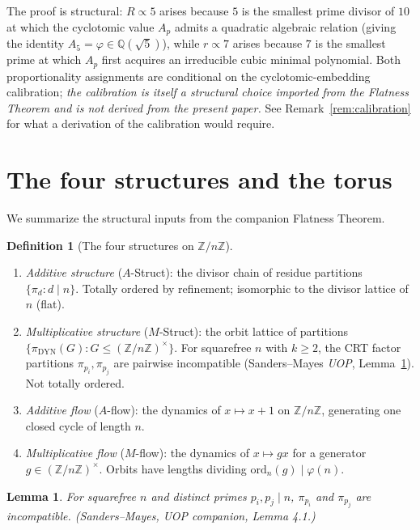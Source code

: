 \documentclass[11pt,reqno]{amsart}
\theoremstyle{plain}
\newtheorem{lemma}[theorem]{Lemma}
\theoremstyle{definition}
\newtheorem{definition}[theorem]{Definition}
\newcommand{\Z}{\mathbb{Z}}
\newcommand{\Q}{\mathbb{Q}}
\newcommand{\Zn}{\Z/n\Z}
\newcommand{\Zns}{(\Z/n\Z)^{\times}}
\newcommand{\DYN}{\mathrm{DYN}}
\newcommand{\ord}{\mathrm{ord}}
\begin{document}
The proof is structural: $R \propto 5$ arises because $5$ is the smallest prime divisor of $10$ at which the cyclotomic value $A_p$ admits a quadratic algebraic relation (giving the identity $A_5 = \varphi \in \Q(\sqrt{5})$), while $r \propto 7$ arises because $7$ is the smallest prime at which $A_p$ first acquires an irreducible cubic minimal polynomial. Both proportionality assignments are conditional on the cyclotomic-embedding calibration; \emph{the calibration is itself a structural choice imported from the Flatness Theorem and is not derived from the present paper.} See Remark~\ref{rem:calibration} for what a derivation of the calibration would require.

\section{The four structures and the torus} \label{sec:torus}

We summarize the structural inputs from the companion Flatness Theorem.

\begin{definition}[The four structures on $\Zn$] \label{def:four-structures}
\begin{enumerate}[label=(\arabic*)]
\item \emph{Additive structure} ($A$-Struct): the divisor chain of residue partitions $\{\pi_d : d \mid n\}$. Totally ordered by refinement; isomorphic to the divisor lattice of $n$ (flat).
\item \emph{Multiplicative structure} ($M$-Struct): the orbit lattice of partitions $\{\pi_{\DYN}(G) : G \leq \Zns\}$. For squarefree $n$ with $k \geq 2$, the CRT factor partitions $\pi_{p_i}, \pi_{p_j}$ are pairwise incompatible (Sanders--Mayes \emph{UOP}, Lemma~\ref{lem:pwise-incomp-cite}). Not totally ordered.
\item \emph{Additive flow} ($A$-flow): the dynamics of $x \mapsto x + 1$ on $\Zn$, generating one closed cycle of length $n$.
\item \emph{Multiplicative flow} ($M$-flow): the dynamics of $x \mapsto g x$ for a generator $g \in \Zns$. Orbits have lengths dividing $\ord_n(g) \mid \varphi(n)$.
\end{enumerate}
\end{definition}

\begin{lemma} \label{lem:pwise-incomp-cite}
For squarefree $n$ and distinct primes $p_i, p_j \mid n$, $\pi_{p_i}$ and $\pi_{p_j}$ are incompatible. \emph{(Sanders--Mayes, UOP companion, Lemma 4.1.)}
\end{lemma}
\end{document}
